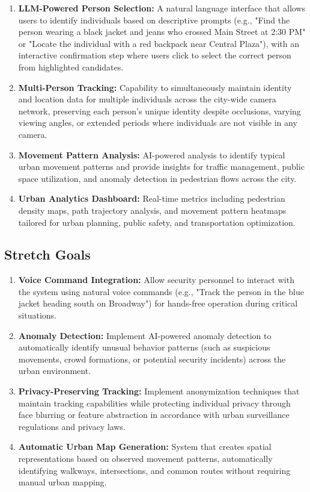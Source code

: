 \begin{enumerate}[leftmargin=80pt]
    \item \textbf{LLM-Powered Person Selection:} A natural language interface that allows users to identify individuals based on descriptive prompts (e.g., "Find the person wearing a black jacket and jeans who crossed Main Street at 2:30 PM" or "Locate the individual with a red backpack near Central Plaza"), with an interactive confirmation step where users click to select the correct person from highlighted candidates.
    \item \textbf{Multi-Person Tracking:} Capability to simultaneously maintain identity and location data for multiple individuals across the city-wide camera network, preserving each person's unique identity despite occlusions, varying viewing angles, or extended periods where individuals are not visible in any camera.
    \item \textbf{Movement Pattern Analysis:} AI-powered analysis to identify typical urban movement patterns and provide insights for traffic management, public space utilization, and anomaly detection in pedestrian flows across the city.
    \item \textbf{Urban Analytics Dashboard:} Real-time metrics including pedestrian density maps, path trajectory analysis, and movement pattern heatmaps tailored for urban planning, public safety, and transportation optimization.
\end{enumerate}

\subsection{Stretch Goals}
\label{subsection:stretch-goals}

\begin{enumerate}[leftmargin=80pt]
    \item \textbf{Voice Command Integration:} Allow security personnel to interact with the system using natural voice commands (e.g., "Track the person in the blue jacket heading south on Broadway") for hands-free operation during critical situations.
    \item \textbf{Anomaly Detection:} Implement AI-powered anomaly detection to automatically identify unusual behavior patterns (such as suspicious movements, crowd formations, or potential security incidents) across the urban environment.
    \item \textbf{Privacy-Preserving Tracking:} Implement anonymization techniques that maintain tracking capabilities while protecting individual privacy through face blurring or feature abstraction in accordance with urban surveillance regulations and privacy laws.
    \item \textbf{Automatic Urban Map Generation:} System that creates spatial representations based on observed movement patterns, automatically identifying walkways, intersections, and common routes without requiring manual urban mapping.
\end{enumerate}


